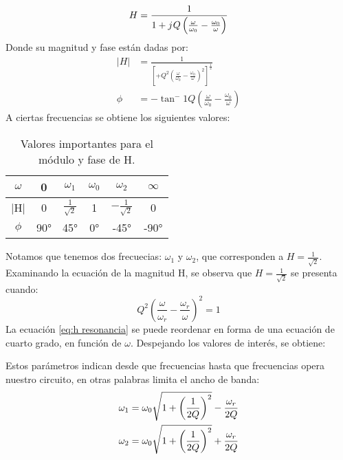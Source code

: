 \documentclass[
	12pt, %
	fleqn, %
	a4paper, %
	oneside, %
]{LegrandOrangeBook}
\begin{document}
\begin{equation}
H=\frac{1}{1+{j\mkern1mu} Q\left(\frac{\omega}{\omega_0}-\frac{\omega_0}{\omega}\right)}
\end{equation}
Donde su magnitud y fase están dadas por:
\begin{align}
|H|&=\frac{1}{\left[+Q^2\left(\frac{\omega}{\omega_0}-\frac{\omega_0}{\omega}\right)^2\right]^{\frac{1}{2}}}\\
\phi&=-\tan^-1Q\left(\frac{\omega}{\omega_0}-\frac{\omega_0}{\omega}\right)
\end{align}
A ciertas frecuencias se obtiene los siguientes valores:
\begin{table}[H]
\centering
\begin{tabular}{|c|c|c|c|c|c|}
\hline
$\omega$ & 0   & $\omega_1$           & $\omega_0$ & $\omega_2$            & $\infty$ \\ \hline
|H|      & 0   & $\frac{1}{\sqrt{2}}$ & 1          & $-\frac{1}{\sqrt{2}}$ & 0        \\ \hline
$\phi$   & 90° & 45°                  & 0°         & -45°                  & -90°     \\ \hline
\end{tabular}
\caption{Valores importantes para el módulo y fase de H.}
\end{table}
Notamos que tenemos dos frecuecias: $\omega_1$ y $\omega_2$, que corresponden a $H=\frac{1}{\sqrt{2}}$. Examinando la ecuación de la magnitud H, se observa que $H=\frac{1}{\sqrt{2}}$ se presenta cuando:
\begin{equation}
Q^2\left(\frac{\omega}{\omega_r}-\frac{\omega_r}{\omega}\right)^2=1
\label{eq:h resonancia}
\end{equation}
La ecuación \ref{eq:h resonancia} se puede reordenar en forma de una ecuación de cuarto grado, en función de $\omega$. Despejando los valores de interés, se obtiene:
\begin{definition}
Estos parámetros indican desde que frecuencias hasta que frecuencias opera nuestro circuito, en otras palabras limita el ancho de banda:
\begin{align}
\omega_1&=\omega_0\sqrt{1+\left(\frac{1}{2Q}\right)^2}-\frac{\omega_r}{2Q}\\
\omega_2&=\omega_0\sqrt{1+\left(\frac{1}{2Q}\right)^2}+\frac{\omega_r}{2Q}
\label{eq:limites de banda}
\end{align}
\end{definition}
\end{document}
